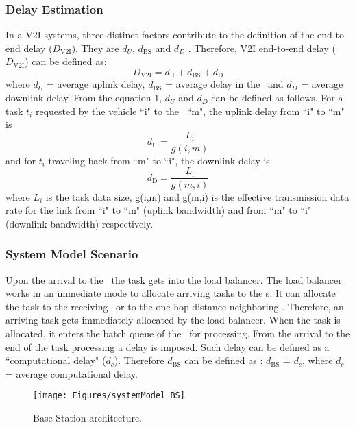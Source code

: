 \subsubsection{Delay Estimation}
In a V2I systems, three distinct factors contribute to the definition of the end-to-end delay ($D_\textrm{V2I}$). They are $d_U$, $d_\textrm{BS}$  and $d_D$ \cite{mostafa2011}. Therefore, V2I end-to-end delay ($D_\textrm{V2I}$) can be defined as: 
\begin{equation}
D_\textrm{V2I} = d_\textrm{U} + d_\textrm{BS} + d_\textrm{D} \label{eq:1}
\end{equation} 
where $d_U$  = average uplink delay, $d_\textrm{BS}$  = average delay in the \bs~and $d_D$  = average downlink delay. From the equation 1, $d_U$  and $d_D$ can be defined as follows. For a task $t_i$  requested by the vehicle ``i" to the \bs~``m", the uplink delay from ``i" to ``m" is \begin{equation} d_\textrm{U} =  \frac{L_\textrm{i}}{g(i,m)} \label{eq:2} \end{equation} and for $t_i$ traveling back from ``m" to ``i", the downlink delay is \begin{equation} d_\textrm{D} =  \frac{L_\textrm{i}}{g(m,i)} \label{eq:3} \end{equation} where $L_i$  is the task data size, g(i,m) and g(m,i) is the effective transmission data rate for the link from ``i" to ``m" (uplink bandwidth) and from ``m" to ``i" (downlink bandwidth) respectively.

\subsubsection{System Model Scenario}
Upon the arrival to the \bs~the task gets into the load balancer. The load balancer works in an immediate mode to allocate arriving tasks to the \bs s. It can allocate the task to the receiving \bs~or to the one-hop distance neighboring \bs. Therefore, an arriving task gets immediately allocated by the load balancer. When the task is allocated, it enters the batch queue of the \bs~for processing. From the arrival to the end of the task processing a delay is imposed. Such delay can be defined as a ``computational delay" ($d_c$). Therefore $d_\textrm{BS}$ can be defined as :  $d_\textrm{BS}$ = $d_c$, where $d_c$ = average computational delay.

\begin{figure}[h!]
\centering	
\texttt{[image: Figures/systemModel\_BS]}
\caption{Base Station architecture.}
\end{figure}

  